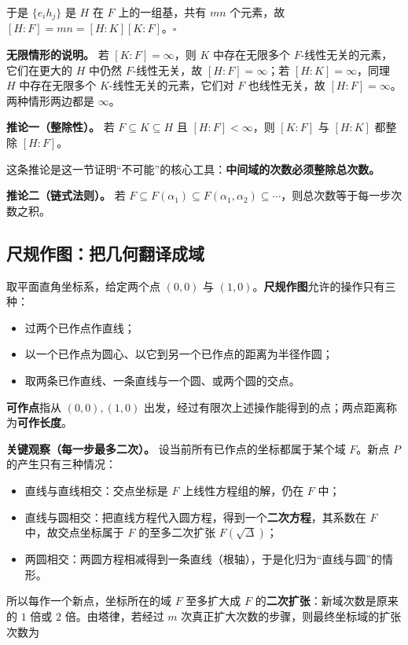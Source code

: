于是 $\{e_ih_j\}$ 是 $H$ 在 $F$ 上的一组基，共有 $mn$ 个元素，故 $[H:F]=mn=[H:K][K:F]$。$\square$

\textbf{无限情形的说明。} 若 $[K:F]=\infty$，则 $K$ 中存在无限多个 $F$-线性无关的元素，它们在更大的 $H$ 中仍然 $F$-线性无关，故 $[H:F]=\infty$；若 $[H:K]=\infty$，同理 $H$ 中存在无限多个 $K$-线性无关的元素，它们对 $F$ 也线性无关，故 $[H:F]=\infty$。两种情形两边都是 $\infty$。

\textbf{推论一（整除性）。} 若 $F\subseteq K\subseteq H$ 且 $[H:F]<\infty$，则 $[K:F]$ 与 $[H:K]$ 都整除 $[H:F]$。

这条推论是这一节证明“不可能”的核心工具：\textbf{中间域的次数必须整除总次数。}

\textbf{推论二（链式法则）。} 若 $F\subseteq F(\alpha_1)\subseteq F(\alpha_1,\alpha_2)\subseteq\cdots$，则总次数等于每一步次数之积。

\subsection{尺规作图：把几何翻译成域}


取平面直角坐标系，给定两个点 $(0,0)$ 与 $(1,0)$。\textbf{尺规作图}允许的操作只有三种：

\begin{itemize}
\item 过两个已作点作直线；
\item 以一个已作点为圆心、以它到另一个已作点的距离为半径作圆；
\item 取两条已作直线、一条直线与一个圆、或两个圆的交点。
\end{itemize}


\textbf{可作点}指从 $(0,0),(1,0)$ 出发，经过有限次上述操作能得到的点；两点距离称为\textbf{可作长度}。

\textbf{关键观察（每一步最多二次）。} 设当前所有已作点的坐标都属于某个域 $F$。新点 $P$ 的产生只有三种情况：

\begin{itemize}
\item 直线与直线相交：交点坐标是 $F$ 上线性方程组的解，仍在 $F$ 中；
\item 直线与圆相交：把直线方程代入圆方程，得到一个\textbf{二次方程}，其系数在 $F$ 中，故交点坐标属于 $F$ 的至多二次扩张 $F(\sqrt{\Delta})$；
\item 两圆相交：两圆方程相减得到一条直线（根轴），于是化归为“直线与圆”的情形。
\end{itemize}


所以每作一个新点，坐标所在的域 $F$ 至多扩大成 $F$ 的\textbf{二次扩张}：新域次数是原来的 $1$ 倍或 $2$ 倍。由塔律，若经过 $m$ 次真正扩大次数的步骤，则最终坐标域的扩张次数为

